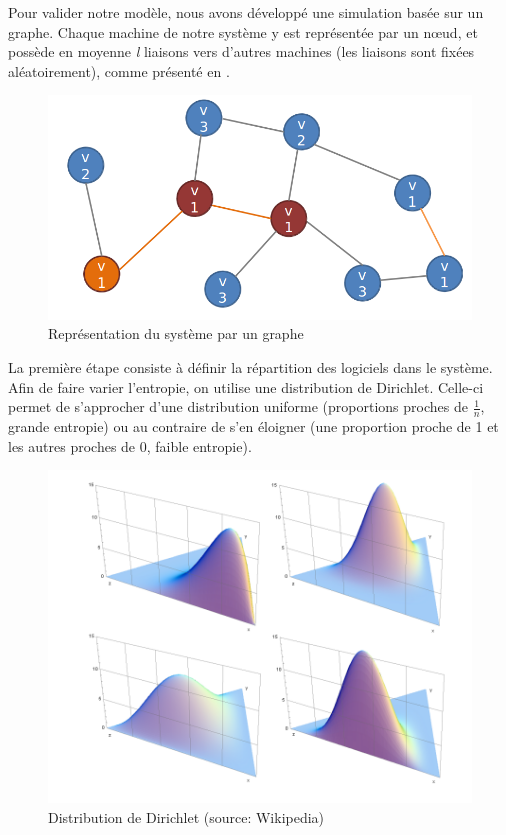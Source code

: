 Pour valider notre modèle, nous avons développé une simulation basée sur un graphe.
Chaque machine de notre système y est représentée par un nœud, et possède en moyenne \textit{l} liaisons vers d'autres machines (les liaisons sont fixées aléatoirement), comme présenté en \label{graph}.

\begin{figure}[ht]
\centering
     \includegraphics[width=1.0\linewidth]{Paul/python/graph.png}
     \caption{Représentation du système par un graphe}
     \label{graph}
\end{figure}

La première étape consiste à définir la répartition des logiciels dans le système. Afin de faire varier l'entropie, on utilise une distribution de Dirichlet. Celle-ci permet de s'approcher d'une distribution uniforme (proportions proches de $\frac{1}{n}$, grande entropie) ou au contraire de s'en éloigner (une proportion proche de 1 et les autres proches de 0, faible entropie). 

\begin{figure}[ht]
\centering
     \includegraphics[width=1.0\linewidth]{Paul/python/dirichlet.png}
     \caption{Distribution de Dirichlet (source: Wikipedia)}
     \label{dirichlet}
\end{figure}

